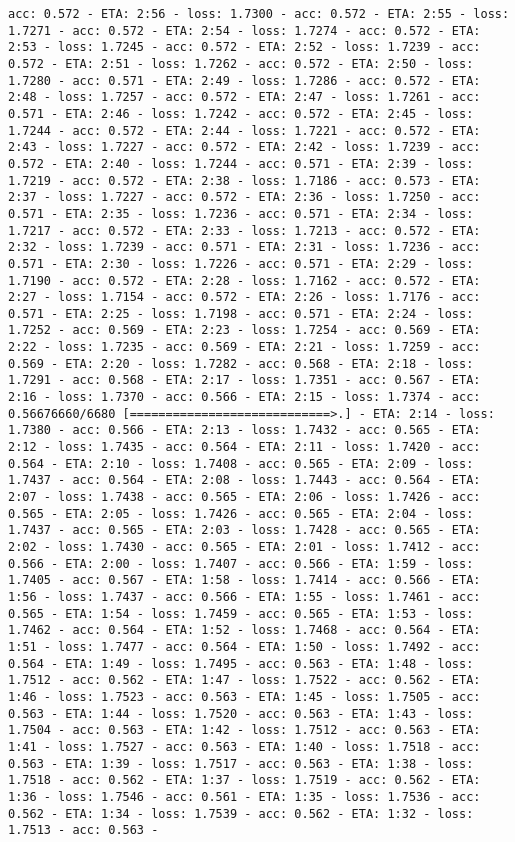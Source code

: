 \documentclass[11pt]{article}
\begin{document}
\begin{Verbatim}[commandchars=\\\{\}]
acc: 0.572 - ETA: 2:56 - loss: 1.7300 - acc: 0.572 - ETA: 2:55 - loss: 1.7271 - acc: 0.572 - ETA: 2:54 - loss: 1.7274 - acc: 0.572 - ETA: 2:53 - loss: 1.7245 - acc: 0.572 - ETA: 2:52 - loss: 1.7239 - acc: 0.572 - ETA: 2:51 - loss: 1.7262 - acc: 0.572 - ETA: 2:50 - loss: 1.7280 - acc: 0.571 - ETA: 2:49 - loss: 1.7286 - acc: 0.572 - ETA: 2:48 - loss: 1.7257 - acc: 0.572 - ETA: 2:47 - loss: 1.7261 - acc: 0.571 - ETA: 2:46 - loss: 1.7242 - acc: 0.572 - ETA: 2:45 - loss: 1.7244 - acc: 0.572 - ETA: 2:44 - loss: 1.7221 - acc: 0.572 - ETA: 2:43 - loss: 1.7227 - acc: 0.572 - ETA: 2:42 - loss: 1.7239 - acc: 0.572 - ETA: 2:40 - loss: 1.7244 - acc: 0.571 - ETA: 2:39 - loss: 1.7219 - acc: 0.572 - ETA: 2:38 - loss: 1.7186 - acc: 0.573 - ETA: 2:37 - loss: 1.7227 - acc: 0.572 - ETA: 2:36 - loss: 1.7250 - acc: 0.571 - ETA: 2:35 - loss: 1.7236 - acc: 0.571 - ETA: 2:34 - loss: 1.7217 - acc: 0.572 - ETA: 2:33 - loss: 1.7213 - acc: 0.572 - ETA: 2:32 - loss: 1.7239 - acc: 0.571 - ETA: 2:31 - loss: 1.7236 - acc: 0.571 - ETA: 2:30 - loss: 1.7226 - acc: 0.571 - ETA: 2:29 - loss: 1.7190 - acc: 0.572 - ETA: 2:28 - loss: 1.7162 - acc: 0.572 - ETA: 2:27 - loss: 1.7154 - acc: 0.572 - ETA: 2:26 - loss: 1.7176 - acc: 0.571 - ETA: 2:25 - loss: 1.7198 - acc: 0.571 - ETA: 2:24 - loss: 1.7252 - acc: 0.569 - ETA: 2:23 - loss: 1.7254 - acc: 0.569 - ETA: 2:22 - loss: 1.7235 - acc: 0.569 - ETA: 2:21 - loss: 1.7259 - acc: 0.569 - ETA: 2:20 - loss: 1.7282 - acc: 0.568 - ETA: 2:18 - loss: 1.7291 - acc: 0.568 - ETA: 2:17 - loss: 1.7351 - acc: 0.567 - ETA: 2:16 - loss: 1.7370 - acc: 0.566 - ETA: 2:15 - loss: 1.7374 - acc: 0.56676660/6680 [============================>.] - ETA: 2:14 - loss: 1.7380 - acc: 0.566 - ETA: 2:13 - loss: 1.7432 - acc: 0.565 - ETA: 2:12 - loss: 1.7435 - acc: 0.564 - ETA: 2:11 - loss: 1.7420 - acc: 0.564 - ETA: 2:10 - loss: 1.7408 - acc: 0.565 - ETA: 2:09 - loss: 1.7437 - acc: 0.564 - ETA: 2:08 - loss: 1.7443 - acc: 0.564 - ETA: 2:07 - loss: 1.7438 - acc: 0.565 - ETA: 2:06 - loss: 1.7426 - acc: 0.565 - ETA: 2:05 - loss: 1.7426 - acc: 0.565 - ETA: 2:04 - loss: 1.7437 - acc: 0.565 - ETA: 2:03 - loss: 1.7428 - acc: 0.565 - ETA: 2:02 - loss: 1.7430 - acc: 0.565 - ETA: 2:01 - loss: 1.7412 - acc: 0.566 - ETA: 2:00 - loss: 1.7407 - acc: 0.566 - ETA: 1:59 - loss: 1.7405 - acc: 0.567 - ETA: 1:58 - loss: 1.7414 - acc: 0.566 - ETA: 1:56 - loss: 1.7437 - acc: 0.566 - ETA: 1:55 - loss: 1.7461 - acc: 0.565 - ETA: 1:54 - loss: 1.7459 - acc: 0.565 - ETA: 1:53 - loss: 1.7462 - acc: 0.564 - ETA: 1:52 - loss: 1.7468 - acc: 0.564 - ETA: 1:51 - loss: 1.7477 - acc: 0.564 - ETA: 1:50 - loss: 1.7492 - acc: 0.564 - ETA: 1:49 - loss: 1.7495 - acc: 0.563 - ETA: 1:48 - loss: 1.7512 - acc: 0.562 - ETA: 1:47 - loss: 1.7522 - acc: 0.562 - ETA: 1:46 - loss: 1.7523 - acc: 0.563 - ETA: 1:45 - loss: 1.7505 - acc: 0.563 - ETA: 1:44 - loss: 1.7520 - acc: 0.563 - ETA: 1:43 - loss: 1.7504 - acc: 0.563 - ETA: 1:42 - loss: 1.7512 - acc: 0.563 - ETA: 1:41 - loss: 1.7527 - acc: 0.563 - ETA: 1:40 - loss: 1.7518 - acc: 0.563 - ETA: 1:39 - loss: 1.7517 - acc: 0.563 - ETA: 1:38 - loss: 1.7518 - acc: 0.562 - ETA: 1:37 - loss: 1.7519 - acc: 0.562 - ETA: 1:36 - loss: 1.7546 - acc: 0.561 - ETA: 1:35 - loss: 1.7536 - acc: 0.562 - ETA: 1:34 - loss: 1.7539 - acc: 0.562 - ETA: 1:32 - loss: 1.7513 - acc: 0.563 - 
\end{Verbatim}
\end{document}
